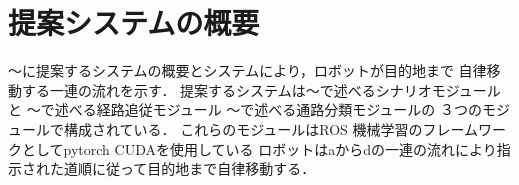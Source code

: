 \section{提案システムの概要}
〜に提案するシステムの概要とシステムにより，ロボットが目的地まで
自律移動する一連の流れを示す．
提案するシステムは〜で述べるシナリオモジュールと
〜で述べる経路追従モジュール
〜で述べる通路分類モジュールの
３つのモジュールで構成されている．
これらのモジュールはROS
機械学習のフレームワークとしてpytorch
CUDAを使用している
ロボットはaからdの一連の流れにより指示された道順に従って目的地まで自律移動する．
